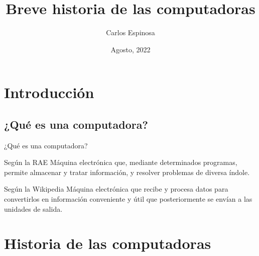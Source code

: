 \documentclass[11pt]{beamer}
\author{Carlos Espinosa}
\title{Breve historia de las computadoras}
\institute{Facultad de Ciencias \\ Universidad Nacional Autónoma de México}
\date{Agosto, 2022}
\begin{document}
\begin{frame}
\titlepage
\end{frame}

\begin{frame}
	\tableofcontents
\end{frame}

\section{Introducción}
	\subsection{¿Qué es una computadora?}
	\begin{frame}{¿Qué es una computadora?}
		\begin{block}{Según la RAE}
			Máquina electrónica que, mediante determinados programas, permite almacenar y tratar información, y resolver problemas de diversa índole.
		\end{block}
		\begin{block}{Según la Wikipedia}
			Máquina electrónica que recibe y procesa datos para convertirlos en información conveniente y útil que posteriormente se envían a las unidades de salida.
		\end{block}
	\end{frame}
\section{Historia de las computadoras}
\end{document}
